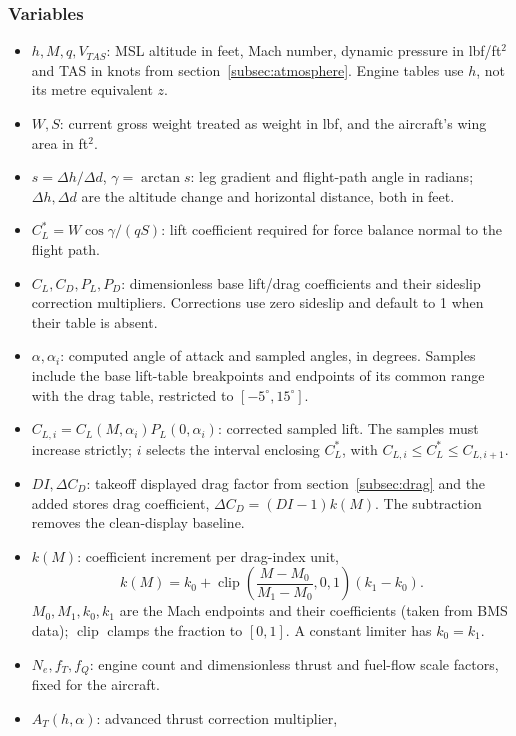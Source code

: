 \documentclass[10pt,a4paper]{amsart}
\DeclareMathOperator{\clip}{clip}
\begin{document}
\subsubsection*{Variables}
\begin{itemize}
\setlength{\itemsep}{0pt}
\setlength{\parsep}{0pt}
\item $h,M,q,V_{TAS}$: MSL altitude in feet, Mach number, dynamic
pressure in lbf/ft$^2$ and TAS in knots from
section~\ref{subsec:atmosphere}. Engine tables use $h$, not its metre
equivalent $z$.
\item $W,S$: current gross weight treated as weight in lbf, and the
aircraft's wing area in ft$^2$.
\item $s=\Delta h/\Delta d$, $\gamma=\arctan s$: leg gradient and
flight-path angle in radians; $\Delta h,\Delta d$ are the altitude
change and horizontal distance, both in feet.
\item $C_L^*=W\cos\gamma/(qS)$: lift coefficient required for force
balance normal to the flight path.
\item $C_L,C_D,P_L,P_D$: dimensionless base lift/drag coefficients and
their sideslip correction multipliers. Corrections use zero sideslip
and default to 1 when their table is absent.
\item $\alpha,\alpha_i$: computed angle of attack and sampled angles,
in degrees. Samples include the base lift-table breakpoints and
endpoints of its common range with the drag table, restricted to
$[-5^\circ,15^\circ]$.
\item $C_{L,i}=C_L(M,\alpha_i)P_L(0,\alpha_i)$: corrected sampled lift.
The samples must increase strictly; $i$ selects the interval enclosing
$C_L^*$, with $C_{L,i}\leq C_L^*\leq C_{L,i+1}$.
\item $DI,\Delta C_D$: takeoff displayed drag factor from
section~\ref{subsec:drag} and the added stores drag coefficient,
$\Delta C_D=(DI-1)k(M)$. The subtraction removes the clean-display baseline.
\item $k(M)$: coefficient increment per drag-index unit,
\[
 k(M)=k_0+\clip\!\left(\frac{M-M_0}{M_1-M_0},0,1\right)(k_1-k_0).
\]
$M_0,M_1,k_0,k_1$ are the Mach endpoints and their coefficients
(taken from BMS data);
$\clip$ clamps the fraction to $[0,1]$. A constant limiter has $k_0=k_1$.
\item $N_e,f_T,f_Q$: engine count and dimensionless thrust
and fuel-flow scale factors, fixed for the aircraft.
\item $A_T(h,\alpha)$: advanced thrust correction multiplier,

\end{itemize}
\end{document}
